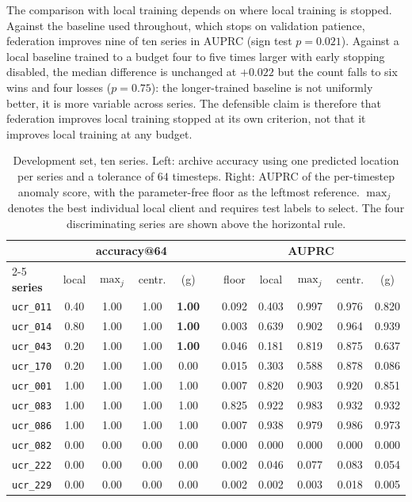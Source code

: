 \documentclass[conference]{IEEEtran}
\begin{document}
The comparison with local training depends on where local training is stopped. Against the baseline used throughout, which stops on validation patience, federation improves nine of ten series in AUPRC (sign test $p=0.021$). Against a local baseline trained to a budget four to five times larger with early stopping disabled, the median difference is unchanged at $+0.022$ but the count falls to six wins and four losses ($p=0.75$): the longer-trained baseline is not uniformly better, it is more variable across series. The defensible claim is therefore that federation improves local training stopped at its own criterion, not that it improves local training at any budget.

\begin{table}[t]
\caption{Development set, ten series. Left: archive accuracy using one predicted location per series and a tolerance of $64$ timesteps. Right: AUPRC of the per-timestep anomaly score, with the parameter-free floor as the leftmost reference. $\max_j$ denotes the best individual local client and requires test labels to select. The four discriminating series are shown above the horizontal rule.}
\label{tab:main}
\centering
\scriptsize
\setlength{\tabcolsep}{2.2pt}
\renewcommand{\arraystretch}{1.1}
\begin{tabular}{@{}l cccc c ccccc@{}}
\hline
& \multicolumn{4}{c}{\textbf{accuracy@64}} & & \multicolumn{5}{c}{\textbf{AUPRC}} \\
\cline{2-5}\cline{7-11}
\textbf{series} & local & $\max_j$ & centr. & (g) & & floor & local & $\max_j$ & centr. & (g) \\
\hline
\texttt{ucr\_011} & 0.40 & 1.00 & 1.00 & \textbf{1.00} & & 0.092 & 0.403 & 0.997 & 0.976 & 0.820 \\
\texttt{ucr\_014} & 0.80 & 1.00 & 1.00 & \textbf{1.00} & & 0.003 & 0.639 & 0.902 & 0.964 & 0.939 \\
\texttt{ucr\_043} & 0.20 & 1.00 & 1.00 & \textbf{1.00} & & 0.046 & 0.181 & 0.819 & 0.875 & 0.637 \\
\texttt{ucr\_170} & 0.20 & 1.00 & 1.00 & 0.00 & & 0.015 & 0.303 & 0.588 & 0.878 & 0.086 \\
\hline
\texttt{ucr\_001} & 1.00 & 1.00 & 1.00 & 1.00 & & 0.007 & 0.820 & 0.903 & 0.920 & 0.851 \\
\texttt{ucr\_083} & 1.00 & 1.00 & 1.00 & 1.00 & & 0.825 & 0.922 & 0.983 & 0.932 & 0.932 \\
\texttt{ucr\_086} & 1.00 & 1.00 & 1.00 & 1.00 & & 0.007 & 0.938 & 0.979 & 0.986 & 0.973 \\
\texttt{ucr\_082} & 0.00 & 0.00 & 0.00 & 0.00 & & 0.000 & 0.000 & 0.000 & 0.000 & 0.000 \\
\texttt{ucr\_222} & 0.00 & 0.00 & 0.00 & 0.00 & & 0.002 & 0.046 & 0.077 & 0.083 & 0.054 \\
\texttt{ucr\_229} & 0.00 & 0.00 & 0.00 & 0.00 & & 0.002 & 0.002 & 0.003 & 0.018 & 0.005 \\
\hline
\end{tabular}
\end{table}
\end{document}
